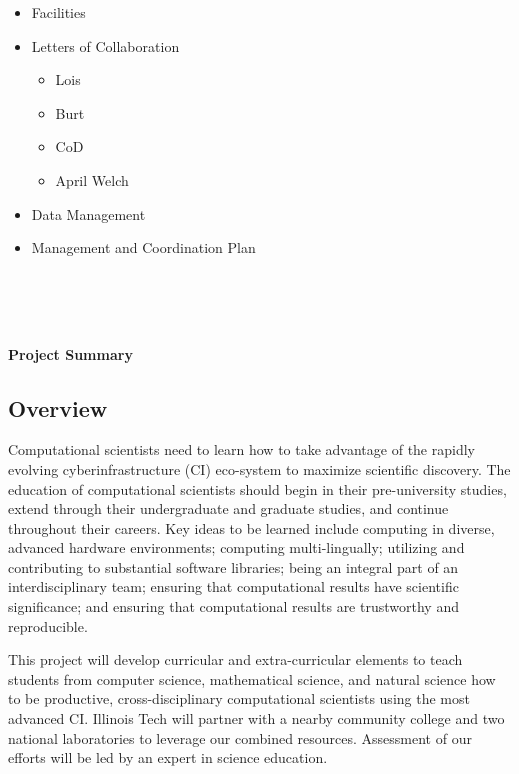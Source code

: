 \documentclass[11pt]{NSFamsart}
\newcommand{\done}{\textcolor{green}{\checkmark}}
\begin{document}
\begin{itemize}
\item[\done] Facilities

\item[\done] Letters of Collaboration
\begin{itemize}
\item[\done] Lois
\item[\done] Burt
\item[\done] CoD
\item[\done] April Welch
\end{itemize}

\item[\done] Data Management

\item[\done] Management and Coordination Plan

\end{itemize}

\bigskip

\noindent
{}\qquad
{} \qquad
{} \\
 \qquad
{}\\
\\

\newpage \setcounter{page}{1} %

\centerline{\Large \textbf{Project Summary}} \hypertarget{ProjSumm}{}
\subsection*{Overview}
Computational scientists need to learn how to take advantage of the rapidly evolving cyberinfrastructure (CI) eco-system to maximize scientific discovery. The education of computational scientists should begin in their pre-university studies,  extend through their undergraduate and graduate studies, and continue throughout their careers. Key ideas to be learned include computing in diverse, advanced hardware environments; computing multi-lingually; utilizing and contributing to substantial software libraries; being an integral part of an interdisciplinary team; ensuring that computational results have scientific significance; and ensuring that computational results are trustworthy and reproducible.  

This project will develop curricular and extra-curricular elements to teach students from computer science, mathematical science, and natural science how to be productive, cross-disciplinary computational scientists using the most advanced CI. Illinois Tech will partner with a nearby community college and two national laboratories to leverage our combined resources. Assessment of our efforts will be led by an expert in science education.
\end{document}
